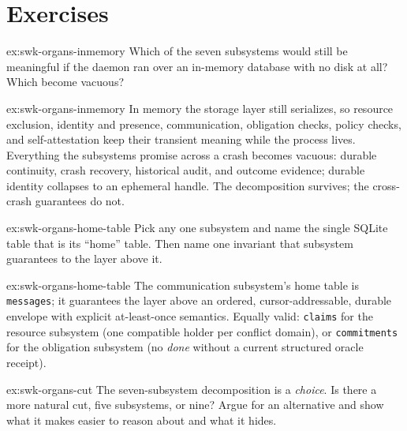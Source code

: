 \documentclass[11pt,a4paper]{article}
\theoremstyle{definition}
\theoremstyle{remark}
\begin{document}
\section{Exercises}
\label{sec:swk-exercises}


\begin{pdexercise}[kind=Check,rating=1]{ex:swk-organs-inmemory}
Which of the seven subsystems would still be meaningful if the daemon ran over an in-memory database with no disk at all? Which become vacuous?
\end{pdexercise}
\begin{pdsolution}{ex:swk-organs-inmemory}
In memory the storage layer still serializes, so resource exclusion, identity and presence, communication, obligation checks, policy checks, and self-attestation keep their transient meaning while the process lives. Everything the subsystems promise across a crash becomes vacuous: durable continuity, crash recovery, historical audit, and outcome evidence; durable identity collapses to an ephemeral handle. The decomposition survives; the cross-crash guarantees do not.
\end{pdsolution}
\begin{pdexercise}[kind=Trace,rating=2]{ex:swk-organs-home-table}
Pick any one subsystem and name the single SQLite table that is its ``home'' table. Then name one invariant that subsystem guarantees to the layer above it.
\end{pdexercise}
\begin{pdsolution}{ex:swk-organs-home-table}
The communication subsystem's home table is \texttt{messages}; it guarantees the layer above an ordered, cursor-addressable, durable envelope with explicit at-least-once semantics. Equally valid: \texttt{claims} for the resource subsystem (one compatible holder per conflict domain), or \texttt{commitments} for the obligation subsystem (no \emph{done} without a current structured oracle receipt).
\end{pdsolution}
\begin{pdexercise}[kind=Open,rating=3]{ex:swk-organs-cut}
The seven-subsystem decomposition is a \emph{choice}. Is there a more natural cut, five subsystems, or nine? Argue for an alternative and show what it makes easier to reason about and what it hides.
\end{pdexercise}
\end{document}
